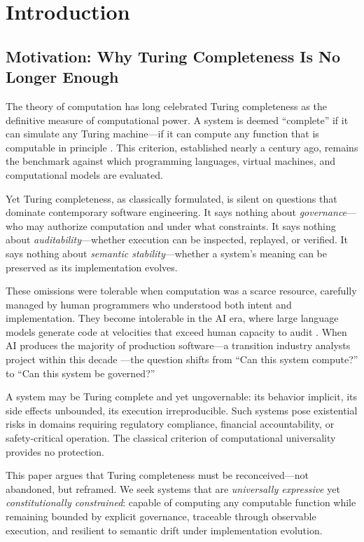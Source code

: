 \documentclass[11pt,a4paper]{article}
\begin{document}
\section{Introduction}
\label{sec:introduction}

\subsection{Motivation: Why Turing Completeness Is No Longer Enough}

The theory of computation has long celebrated Turing completeness as the definitive measure of computational power. A system is deemed ``complete'' if it can simulate any Turing machine---if it can compute any function that is computable in principle \citep{turing1936computable}. This criterion, established nearly a century ago, remains the benchmark against which programming languages, virtual machines, and computational models are evaluated.

Yet Turing completeness, as classically formulated, is silent on questions that dominate contemporary software engineering. It says nothing about \emph{governance}---who may authorize computation and under what constraints. It says nothing about \emph{auditability}---whether execution can be inspected, replayed, or verified. It says nothing about \emph{semantic stability}---whether a system's meaning can be preserved as its implementation evolves.

These omissions were tolerable when computation was a scarce resource, carefully managed by human programmers who understood both intent and implementation. They become intolerable in the AI era, where large language models generate code at velocities that exceed human capacity to audit \citep{chen2021evaluating}. When AI produces the majority of production software---a transition industry analysts project within this decade \citep{github2023copilot}---the question shifts from ``Can this system compute?'' to ``Can this system be governed?''

A system may be Turing complete and yet ungovernable: its behavior implicit, its side effects unbounded, its execution irreproducible. Such systems pose existential risks in domains requiring regulatory compliance, financial accountability, or safety-critical operation. The classical criterion of computational universality provides no protection.

This paper argues that Turing completeness must be reconceived---not abandoned, but reframed. We seek systems that are \emph{universally expressive} yet \emph{constitutionally constrained}: capable of computing any computable function while remaining bounded by explicit governance, traceable through observable execution, and resilient to semantic drift under implementation evolution.
\end{document}
